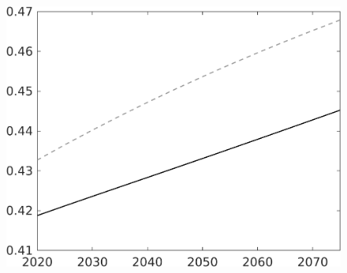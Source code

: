 \documentclass[12pt]{article}
\begin{document}
\begin{figure}[h!!]
\begin{minipage}[]{0.32\textwidth}
	\end{minipage}	
	\begin{minipage}[]{0.32\textwidth}
		\includegraphics[width=1\textwidth]{../../codding_model/own_basedOnFried/optimalPol_010922_revision/figures/all_13Sept22/LevTaufNoTauf_TaulCalib_Equlab_regime0_EY_spillover0_nsk0_xgr0_knspil1_sep1_LFlimit0_emsbase0_countec0_GovRev0_etaa0.79_lgd0.png}
	\end{minipage}		
\end{figure}
\end{document}
